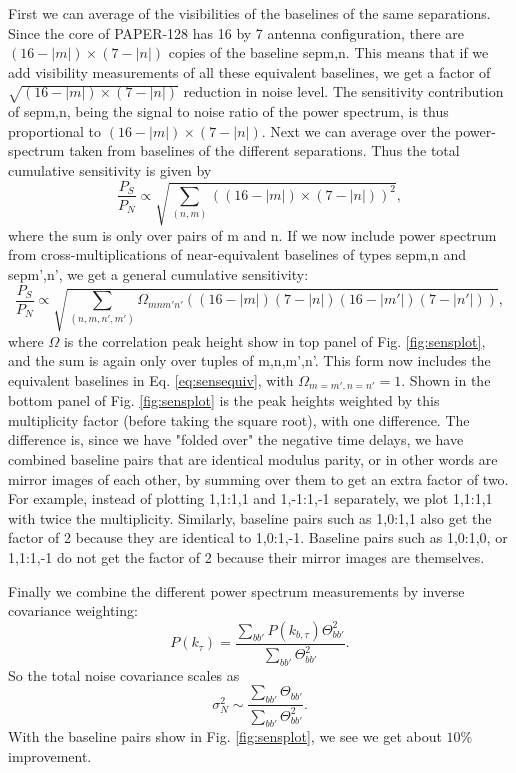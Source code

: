 \documentclass[preprint2,numberedappendix,tighten,twocolappendix]{aastex6}  %
\renewcommand\[{\begin{equation}}
\renewcommand\]{\end{equation}}
\begin{document}
First we can average of the visibilities of the baselines of the same
separations. Since the core of PAPER-128 has 16 by 7 antenna configuration, there
are $(16-|m|)\times(7-|n|)$ copies of the baseline sepm,n. This means
that if we add visibility measurements of all these equivalent baselines,
we get a factor of $\sqrt{(16-|m|)\times(7-|n|)}$ reduction in noise
level. The sensitivity contribution of sepm,n, being the signal to
noise ratio of the power spectrum, is thus proportional to $(16-|m|)\times(7-|n|)$.
Next we can average over the power-spectrum taken from baselines of
the different separations. Thus the total cumulative sensitivity is
given by 
\begin{equation}
\frac{P_{S}}{P_{N}}\propto\sqrt{\sum_{(n,m)}\left((16-|m|)\times(7-|n|)\right)^{2}},\label{eq:sensequiv}
\end{equation}
where the sum is only over pairs of m and n. If we now include power
spectrum from cross-multiplications of near-equivalent baselines of
types sepm,n and sepm',n', we get a general cumulative sensitivity:
\small
\begin{equation}
\frac{P_{S}}{P_{N}}\propto\sqrt{\sum_{(n,m,n',m')}\Omega_{mnm'n'}\left((16-|m|)(7-|n|)(16-|m'|)(7-|n'|)\right)},\label{eq:sensul}
\end{equation}
\normalsize
where $\Omega$ is the correlation peak height show in top panel of Fig. \eqref{fig:sensplot},
and the sum is again only over tuples of m,n,m',n'. This form now
includes the equivalent baselines in Eq. \eqref{eq:sensequiv}, with
$\Omega_{m=m',n=n'}=1$. 
Shown in the bottom panel of Fig. \eqref{fig:sensplot} is the peak heights weighted
by this multiplicity factor (before taking the square root), with one difference. The difference is, 
since we have "folded over" the negative time delays, we have combined baseline pairs that are identical modulus parity, 
or in other words are mirror images of each other, by summing over them to get an extra factor of two. For example, 
instead of plotting 1,1:1,1 and 1,-1:1,-1 separately, we plot 1,1:1,1 with twice the multiplicity. Similarly, baseline pairs such as 
1,0:1,1 also get the factor of 2 because they are identical to 1,0:1,-1. Baseline pairs such as 1,0:1,0, or 1,1:1,-1 do not get
the factor of 2 because their mirror images are themselves. 

Finally we combine the different power spectrum measurements by inverse covariance weighting:
\begin{equation}
 P(k_{\tau}) = \frac{\sum_{bb'}P(k_{b,\tau})\Theta_{bb'}^2}{\sum_{bb'}\Theta_{bb'}^2}.
\end{equation}
So the total noise covariance scales as 
\begin{equation}
\sigma_N^2 \sim \frac{\sum_{bb'}\Theta_{bb'}}{\sum_{bb'}\Theta_{bb'}^2}.
\end{equation}
With the baseline pairs show in Fig. \ref{fig:sensplot}, we see we get about $10\%$ improvement. 
\end{document}
